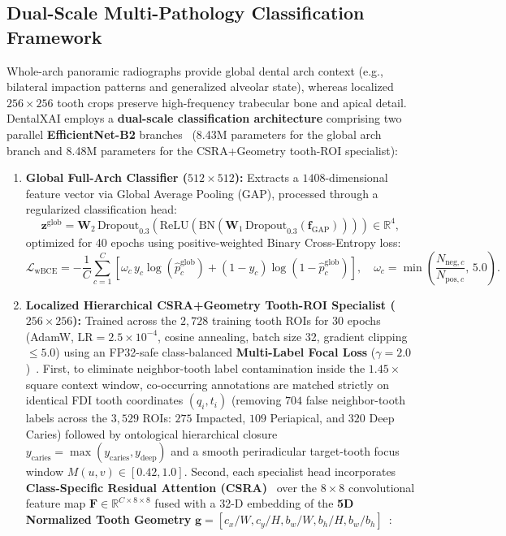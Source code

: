 \documentclass[review]{elsarticle}
\begin{document}
\subsection{Dual-Scale Multi-Pathology Classification Framework}
Whole-arch panoramic radiographs provide global dental arch context (e.g., bilateral impaction patterns and generalized alveolar state), whereas localized $256 \times 256$ tooth crops preserve high-frequency trabecular bone and apical detail. DentalXAI employs a \textbf{dual-scale classification architecture} comprising two parallel \textbf{EfficientNet-B2} branches~\cite{tan2019efficientnet} (8.43M parameters for the global arch branch and 8.48M parameters for the CSRA+Geometry tooth-ROI specialist):
\begin{enumerate}
    \item \textbf{Global Full-Arch Classifier ($512 \times 512$):} Extracts a $1408$-dimensional feature vector via Global Average Pooling (GAP), processed through a regularized classification head:
    \begin{equation}
        \mathbf{z}^{\text{glob}} = \mathbf{W}_2\,\text{Dropout}_{0.3}\!\left(\text{ReLU}\!\left(\text{BN}\!\left(\mathbf{W}_1\,\text{Dropout}_{0.3}(\mathbf{f}_{\text{GAP}})\right)\right)\right) \in \mathbb{R}^{4},
    \end{equation}
    optimized for 40 epochs using positive-weighted Binary Cross-Entropy loss:
    \begin{equation}
        \mathcal{L}_{\text{wBCE}} = -\frac{1}{C}\sum_{c=1}^{C} \left[ \omega_c\, y_c \log(\hat{p}^{\text{glob}}_c) + (1 - y_c)\log(1 - \hat{p}^{\text{glob}}_c) \right], \quad \omega_c = \min\!\left(\frac{N_{\text{neg},c}}{N_{\text{pos},c}},\, 5.0\right).
        \label{eq:wbce}
    \end{equation}
    \item \textbf{Localized Hierarchical CSRA+Geometry Tooth-ROI Specialist ($256 \times 256$):} Trained across the $2,728$ training tooth ROIs for 30 epochs (AdamW, $\text{LR}=2.5\times 10^{-4}$, cosine annealing, batch size 32, gradient clipping $\le 5.0$) using an FP32-safe class-balanced \textbf{Multi-Label Focal Loss} ($\gamma=2.0$)~\cite{lin2017focal}. First, to eliminate neighbor-tooth label contamination inside the $1.45\times$ square context window, co-occurring annotations are matched strictly on identical FDI tooth coordinates $(q_i, t_i)$ (removing $704$ false neighbor-tooth labels across the $3,529$ ROIs: $275$ Impacted, $109$ Periapical, and $320$ Deep Caries) followed by ontological hierarchical closure $y_{\text{caries}} = \max(y_{\text{caries}}, y_{\text{deep}})$ and a smooth periradicular target-tooth focus window $M(u,v) \in [0.42, 1.0]$. Second, each specialist head incorporates \textbf{Class-Specific Residual Attention (CSRA)}~\cite{zhu2021residual} over the $8 \times 8$ convolutional feature map $\mathbf{F} \in \mathbb{R}^{C \times 8 \times 8}$ fused with a 32-D embedding of the \textbf{5D Normalized Tooth Geometry} $\mathbf{g} = [c_x/W, c_y/H, b_w/W, b_h/H, b_w/b_h]$~\cite{hamamci2023dentex}:

\end{enumerate}
\end{document}
